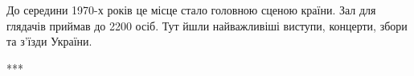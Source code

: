 
До середини 1970-х років це місце стало головною сценою країни. Зал для
глядачів приймав до 2200 осіб. Тут йшли найважливіші виступи, концерти, збори
та з'їзди України.

***

